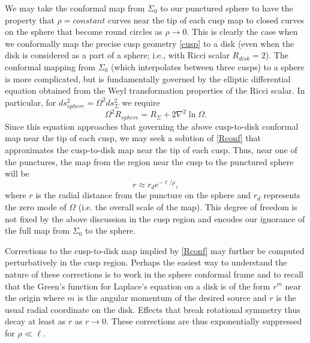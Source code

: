 \documentclass[12pt]{article}
\numberwithin{equation}{section}
\begin{document}
We may take the conformal map from $\Sigma_0$ to our punctured sphere to have the property that $\rho = constant$ curves near the tip of each cusp map to closed curves on the sphere that become round circles as $\rho \rightarrow 0$.  This is clearly the case when we conformally map the precise cusp geometry \eqref{cusp} to a disk (even when the disk is considered as a part of a sphere; i.e., with Ricci scalar $R_{disk} = 2$).  The conformal mapping from $\Sigma_0$ (which interpolates between three cusps) to a sphere is more complicated, but is fundamentally governed by the elliptic differential equation obtained from the Weyl transformation properties of the Ricci scalar. In particular, for $ds^2_{sphere} = \Omega^2 ds^2_\Sigma$ we require
\begin{equation}
\label{Rconf}
\Omega^2 R_{sphere} = R_{\Sigma} + 2 \nabla^2 \ln \Omega .
\end{equation}
Since this equation approaches that governing the above cusp-to-disk conformal map near the tip of each cusp, we may seek a solution of \eqref{Rconf} that approximates the cusp-to-disk map near the tip of each cusp.  Thus, near one of the punctures, the map from the region near the cusp to the punctured sphere will be
\begin{equation}
\label{cuspmap}
r \approx r_d e^{-\ell/\rho},
\end{equation}
where $r$ is the radial distance from the puncture on the sphere and $r_d$ represents the zero mode of $\Omega$ (i.e. the overall scale of the map).   This degree of freedom is not fixed by the above discussion in the cusp region and encodes our ignorance of the full map from $\Sigma_0$ to the sphere.

Corrections to the cusp-to-disk map implied by \eqref{Rconf} may further be computed perturbatively in the cusp region.  Perhaps the easiest way to understand the nature of these corrections is to work in the sphere conformal frame and to recall that the Green's function for Laplace's equation on a disk is of the form $r^m$ near the origin where $m$ is the angular momentum of the desired source and $r$ is the usual radial coordinate on the disk.  Effects that break rotational symmetry thus decay at least as $r$ as $r \rightarrow 0$. These corrections are thus exponentially suppressed for $\rho \ll \ell$.
\end{document}

